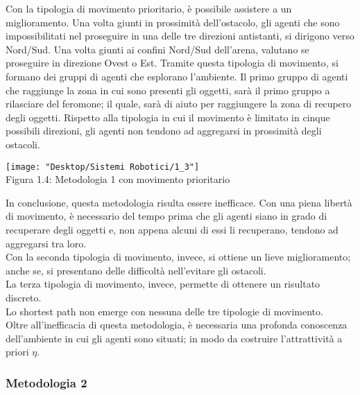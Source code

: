 \documentclass[12pt,a4paper,openright,twoside]{report}
\begin{document}
Con la tipologia di movimento prioritario, è possibile assistere a un miglioramento. Una volta giunti in prossimità dell'ostacolo, gli agenti che sono impossibilitati nel proseguire in una delle tre direzioni antistanti, si dirigono verso Nord/Sud. Una volta giunti ai confini Nord/Sud dell'arena, valutano se proseguire in direzione Ovest o Est. Tramite questa tipologia di movimento, si formano dei gruppi di agenti che esplorano l'ambiente. Il primo gruppo di agenti che raggiunge la zona in cui sono presenti gli oggetti, sarà il primo gruppo a rilasciare del feromone; il quale, sarà di aiuto per raggiungere la zona di recupero degli oggetti. Rispetto alla tipologia in cui il movimento è limitato in cinque possibili direzioni, gli agenti non tendono ad aggregarsi in prossimità degli ostacoli.

\begin{center}  
	\texttt{[image: "Desktop/Sistemi Robotici/1\_3"]}
	\\Figura 1.4: Metodologia 1 con movimento prioritario
\end{center}

In conclusione, questa metodologia risulta essere inefficace. Con una piena libertà di movimento, è necessario del tempo prima che gli agenti siano in grado di recuperare degli oggetti e, non appena alcuni di essi li recuperano, tendono ad aggregarsi tra loro.\\ Con la seconda tipologia di movimento, invece, si ottiene un lieve miglioramento; anche se, si presentano delle difficoltà nell'evitare gli ostacoli.\\La terza tipologia di movimento, invece, permette di ottenere un risultato discreto.\\
Lo shortest path non emerge con nessuna delle tre tipologie di movimento.\\
Oltre all'inefficacia di questa metodologia, è necessaria una profonda conoscenza dell'ambiente in cui gli agenti sono situati; in modo da costruire l'attrattività a priori $\eta$.

\subsubsection{Metodologia 2}
\end{document}
